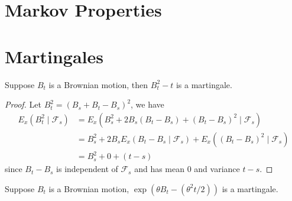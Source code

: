 \section{Markov Properties}

\section{Martingales}

\begin{example}
    Suppose $B_{t}$ is a Brownian motion, then $B_{t}^{2}-t$ is a martingale.
\end{example}

\begin{proof}
    Let $B_{t}^{2}=\left(B_{s}+B_{t}-B_{s}\right)^{2}$, we have
    \begin{equation*}
        \begin{aligned}
            E_{x}\left(B_{t}^{2}\mid\mathcal{F}_{s}\right) & =E_{x}\left(B_{s}^{2}+2 B_{s}\left(B_{t}-B_{s}\right)+\left(B_{t}-B_{s}\right)^{2} \mid \mathcal{F}_{s}\right)                            \\
                                                           & =B_{s}^{2}+2 B_{s} E_{x}\left(B_{t}-B_{s} \mid \mathcal{F}_{s}\right)+E_{x}\left(\left(B_{t}-B_{s}\right)^{2} \mid \mathcal{F}_{s}\right) \\
                                                           & =B_{s}^{2}+0+(t-s)
        \end{aligned}
    \end{equation*}
    since $B_{t}-B_{s}$ is independent of $\mathcal{F}_{s}$ and has mean 0 and variance $t-s$.
\end{proof}

\begin{example}
    Suppose $B_{t}$ is a Brownian motion, $\exp\left(\theta B_{t}-\left(\theta^{2}t/2\right)\right)$ is a martingale.
\end{example}

